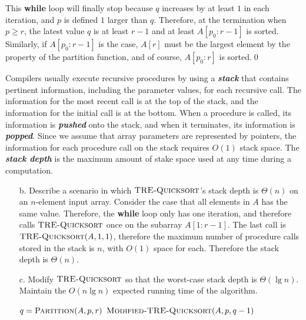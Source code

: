 \documentclass[12pt,reqno]{amsart}
\newif\ifanswer
\begin{document}
\begin{enumerate}[1.]
\begin{enumerate}
    This \textbf{while} loop will finally stop because $q$ increases by at least $1$ in each iteration, and $p$ is defined $1$ larger than $q$. Therefore, at the termination when $p\geq r$, the latest value $q$ is at least $r - 1$ and at least $A[p_0: r - 1]$ is sorted. Similarly, if $A[p_0: r - 1]$ is the case, $A[r]$ must be the largest element by the property of the partition function, and of course, $A[p_0: r]$ is sorted.\qed
\end{enumerate}
Compilers usually execute recursive procedures by using a \textit{\textbf{stack}} that contains pertinent information, including the parameter values, for each recursive call. The information for the most recent call is at the top of the stack, and the information for the initial call is at the bottom. When a procedure is called, its information is \textit{\textbf{pushed}} onto the stack, and when it terminates, its information is \textit{\textbf{popped}}. Since we assume that array parameters are represented by pointers, the information for each procedure call on the stack requires $O(1)$ stack space. The \textit{\textbf{stack depth}} is the maximum amount of stake space used at any time during a computation.
\begin{enumerate}
    \item[b.] Describe a scenario in which $\textsc{TRE-Quicksort}$'s stack depth is $\Theta(n)$ on an $n$-element input array.
    \ifanswer
    \noindent {\bf \\Solution}
    Consider the case that all elements in $A$ has the same value. Therefore, the \textbf{while} loop only has one iteration, and therefore calls $\textsc{TRE-Quicksort}$ once on the subarray $A[1: r - 1]$. The last call is $\textsc{TRE-Quicksort}(A, 1, 1)$, therefore the maximum number of procedure calls stored in the stack is $n$, with $O(1)$ space for each. Therefore the stack depth is $\Theta(n)$.
    \item[c.] Modify $\textsc{TRE-Quicksort}$ so that the worst-case stack depth is $\Theta(\lg{n})$. Maintain the $O(n\lg{n})$ expected running time of the algorithm.
    \ifanswer
    \noindent {\bf \\Solution}
    \begin{algorithm}
        \caption{$\textsc{Modified-TRE-Quicksort}(A, p, r)$}
        \begin{algorithmic}[1]
                \STATE $q = \textsc{Partition}(A, p, r)$
                    \STATE $\textsc{Modified-TRE-Quicksort}(A, p, q - 1)$

\end{algorithmic}
\end{algorithm}
\end{enumerate}
\end{enumerate}
\end{document}
